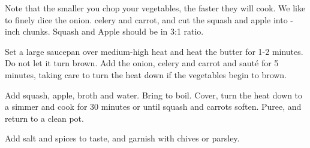 Note that the smaller you chop your vegetables, the faster they will cook. 
We like to finely dice the onion. celery and carrot, and cut the squash and apple into -inch chunks.
Squash and Apple should be in 3:1 ratio.

Set a large saucepan over medium-high heat and heat the butter for 1-2 minutes. 
Do not let it turn brown. Add the onion, celery and carrot and sauté for 5 minutes, taking care to 
turn the heat down if the vegetables begin to brown.

Add squash, apple, broth and water. Bring to boil. Cover, turn the heat down to a simmer and cook 
for 30 minutes or until squash and carrots soften. Puree, and return to a clean pot.

Add salt and spices to taste, and garnish with chives or parsley.